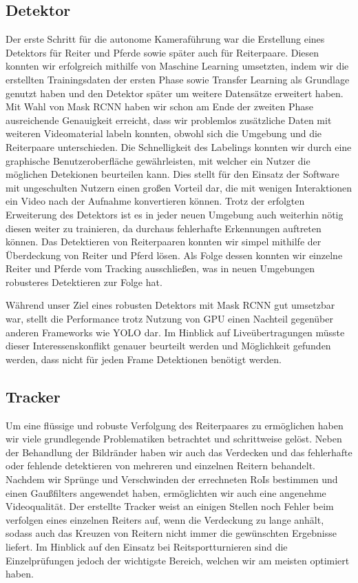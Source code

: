 \subsection*{ Detektor}
Der erste Schritt für die autonome Kameraführung war die Erstellung eines Detektors für Reiter und Pferde sowie später auch für Reiterpaare. Diesen konnten wir erfolgreich mithilfe von Maschine Learning umsetzten, indem wir die erstellten Trainingsdaten der ersten Phase sowie Transfer Learning als Grundlage genutzt haben und den Detektor später um weitere Datensätze erweitert haben. Mit Wahl von Mask RCNN haben wir schon am Ende der zweiten Phase ausreichende Genauigkeit erreicht, dass wir problemlos zusätzliche Daten mit weiteren Videomaterial labeln konnten, obwohl sich die Umgebung und die Reiterpaare unterschieden. Die Schnelligkeit des Labelings konnten wir durch eine graphische Benutzeroberfläche gewährleisten, mit welcher ein Nutzer die möglichen Detekionen beurteilen kann. Dies stellt für den Einsatz der Software mit ungeschulten Nutzern einen großen Vorteil dar, die mit wenigen Interaktionen ein Video nach der Aufnahme konvertieren können. Trotz der erfolgten Erweiterung des Detektors ist es in jeder neuen Umgebung auch weiterhin nötig diesen weiter zu trainieren, da durchaus fehlerhafte Erkennungen auftreten können.
Das Detektieren von Reiterpaaren konnten wir simpel mithilfe der Überdeckung von Reiter und Pferd lösen. Als Folge dessen konnten wir einzelne Reiter und Pferde vom Tracking ausschließen, was in neuen Umgebungen robusteres Detektieren zur Folge hat.

Während unser Ziel eines robusten Detektors mit Mask RCNN gut umsetzbar war, stellt die Performance trotz Nutzung von GPU einen Nachteil gegenüber anderen Frameworks wie YOLO dar. Im Hinblick auf Liveübertragungen müsste dieser Interessenskonflikt genauer beurteilt werden und Möglichkeit gefunden werden, dass nicht für jeden Frame Detektionen benötigt werden.


\subsection*{ Tracker}
Um eine flüssige und robuste Verfolgung des Reiterpaares zu ermöglichen haben wir viele grundlegende Problematiken betrachtet und schrittweise gelöst. Neben der Behandlung der Bildränder haben wir auch das Verdecken und das fehlerhafte oder fehlende detektieren von mehreren und einzelnen Reitern behandelt. Nachdem wir Sprünge und Verschwinden der errechneten RoIs bestimmen und einen Gaußfilters angewendet haben, ermöglichten wir auch eine angenehme Videoqualität. 
Der erstellte Tracker weist an einigen Stellen noch Fehler beim verfolgen eines einzelnen Reiters auf, wenn die Verdeckung zu lange anhält, sodass auch das Kreuzen von Reitern nicht immer die gewünschten Ergebnisse liefert. Im Hinblick auf den Einsatz bei Reitsportturnieren sind die Einzelprüfungen jedoch der wichtigste Bereich, welchen wir am meisten optimiert haben.


